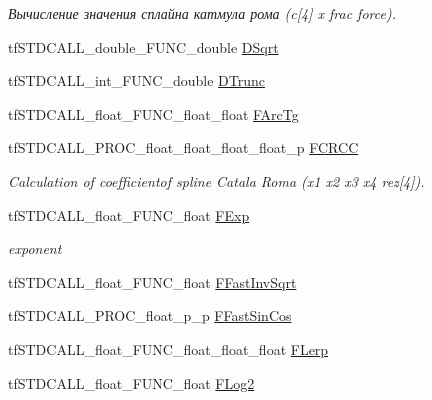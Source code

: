 \begin{DoxyCompactItemize}
\begin{DoxyCompactList}\small\item\em Вычисление значения сплайна катмула рома (c\mbox{[}4\mbox{]} x frac force). \end{DoxyCompactList}\item 
tf\-S\-T\-D\-C\-A\-L\-L\-\_\-double\-\_\-\-F\-U\-N\-C\-\_\-double \hyperlink{structs_functions_math_c_p_u_a5f47fae59cbd2d599efc815d1c1c35dc}{D\-Sqrt}
\item 
tf\-S\-T\-D\-C\-A\-L\-L\-\_\-int\-\_\-\-F\-U\-N\-C\-\_\-double \hyperlink{structs_functions_math_c_p_u_a074411055b96fed599954c5f34c22d26}{D\-Trunc}
\item 
tf\-S\-T\-D\-C\-A\-L\-L\-\_\-float\-\_\-\-F\-U\-N\-C\-\_\-float\-\_\-float \hyperlink{structs_functions_math_c_p_u_aa6c04010f7c30ddc2ec9df0a087a9ff9}{F\-Arc\-Tg}
\item 
\hypertarget{structs_functions_math_c_p_u_af20f511930cfa1f5057923b4a47834a7}{tf\-S\-T\-D\-C\-A\-L\-L\-\_\-\-P\-R\-O\-C\-\_\-float\-\_\-float\-\_\-float\-\_\-float\-\_\-p \hyperlink{structs_functions_math_c_p_u_af20f511930cfa1f5057923b4a47834a7}{F\-C\-R\-C\-C}}\label{structs_functions_math_c_p_u_af20f511930cfa1f5057923b4a47834a7}

\begin{DoxyCompactList}\small\item\em Calculation of coefficientof spline Catala Roma (x1 x2 x3 x4 rez\mbox{[}4\mbox{]}). \end{DoxyCompactList}\item 
\hypertarget{structs_functions_math_c_p_u_aed75a4596b05d75275446184915bebd4}{tf\-S\-T\-D\-C\-A\-L\-L\-\_\-float\-\_\-\-F\-U\-N\-C\-\_\-float \hyperlink{structs_functions_math_c_p_u_aed75a4596b05d75275446184915bebd4}{F\-Exp}}\label{structs_functions_math_c_p_u_aed75a4596b05d75275446184915bebd4}

\begin{DoxyCompactList}\small\item\em exponent \end{DoxyCompactList}\item 
tf\-S\-T\-D\-C\-A\-L\-L\-\_\-float\-\_\-\-F\-U\-N\-C\-\_\-float \hyperlink{structs_functions_math_c_p_u_a7031ad890c4994899cea86c4e87e441b}{F\-Fast\-Inv\-Sqrt}
\item 
tf\-S\-T\-D\-C\-A\-L\-L\-\_\-\-P\-R\-O\-C\-\_\-float\-\_\-p\-\_\-p \hyperlink{structs_functions_math_c_p_u_a59690bbd4df0b6c4e84b6eca0760c11b}{F\-Fast\-Sin\-Cos}
\item 
tf\-S\-T\-D\-C\-A\-L\-L\-\_\-float\-\_\-\-F\-U\-N\-C\-\_\-float\-\_\-float\-\_\-float \hyperlink{structs_functions_math_c_p_u_abf0eff942eabf31383f7aaf90ab9137e}{F\-Lerp}
\item 
\hypertarget{structs_functions_math_c_p_u_a46af1e35bc73a4f4a4d6f798e1776e89}{tf\-S\-T\-D\-C\-A\-L\-L\-\_\-float\-\_\-\-F\-U\-N\-C\-\_\-float \hyperlink{structs_functions_math_c_p_u_a46af1e35bc73a4f4a4d6f798e1776e89}{F\-Log2}}\label{structs_functions_math_c_p_u_a46af1e35bc73a4f4a4d6f798e1776e89}


\end{DoxyCompactItemize}
